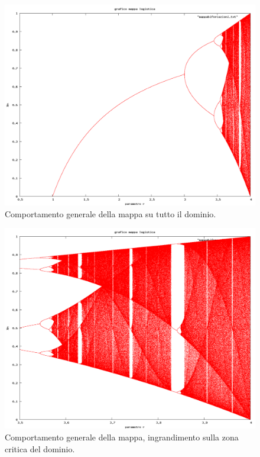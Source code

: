 \documentclass[13pt]{article}
\begin{document}
\begin{figure}
\includegraphics[width=24cm,keepaspectratio]{picture/mappa7/mappabif-joined}
\caption{Comportamento generale della mappa su tutto il dominio.}
\label{fig:general}
\end{figure}

\begin{figure}
\includegraphics[width=24cm,keepaspectratio]{picture/mappa7/mappabiforcazioni1-joined}
\caption{Comportamento generale della mappa, ingrandimento sulla zona critica del dominio.}
\label{fig:general_zoom}
\end{figure}
\end{document}
